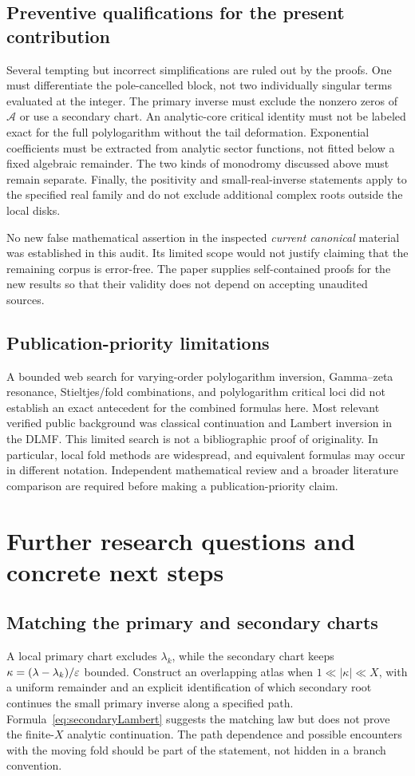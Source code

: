 \documentclass[11pt,a4paper]{article}
\numberwithin{equation}{section}
\theoremstyle{definition}\newtheorem{definition}[theorem]{Definition}
\theoremstyle{remark}\newtheorem{remark}[theorem]{Remark}
\newcommand{\A}{\mathcal A}\newcommand{\E}{\mathcal E}
\begin{document}
\subsection{Preventive qualifications for the present contribution}
Several tempting but incorrect simplifications are ruled out by the
proofs. One must differentiate the pole-cancelled block, not two
individually singular terms evaluated at the integer. The primary inverse
must exclude the nonzero zeros of $\A$ or use a secondary chart.
An analytic-core critical identity must not be labeled exact for the full
polylogarithm without the tail deformation. Exponential coefficients must
be extracted from analytic sector functions, not fitted below a fixed
algebraic remainder. The two kinds of monodromy discussed above must
remain separate. Finally, the positivity and small-real-inverse statements
apply to the specified real family and do not exclude additional complex
roots outside the local disks.

No new false mathematical assertion in the inspected \emph{current
canonical} material was established in this audit. Its limited scope
would not justify claiming that the remaining corpus is error-free.
The paper supplies self-contained proofs for the new results so that
their validity does not depend on accepting unaudited sources.

\subsection{Publication-priority limitations}
A bounded web search for varying-order polylogarithm inversion,
Gamma--zeta resonance, Stieltjes/fold combinations, and polylogarithm
critical loci did not establish an exact antecedent for the combined
formulas here. Most relevant verified public background was classical
continuation and Lambert inversion in the DLMF. This limited search is
not a bibliographic proof of originality. In particular, local fold
methods are widespread, and equivalent formulas may occur in different
notation. Independent mathematical review and a broader literature
comparison are required before making a publication-priority claim.

\section{Further research questions and concrete next steps}
\label{sec:future}
\subsection{Matching the primary and secondary charts}
A local primary chart excludes $\lambda_k$, while the secondary chart
keeps $\kappa=(\lambda-\lambda_k)/\varepsilon$ bounded. Construct an overlapping
atlas when $1\ll|\kappa|\ll X$, with a uniform remainder and an explicit
identification of which secondary root continues the small primary
inverse along a specified path. Formula~\eqref{eq:secondaryLambert}
suggests the matching law but does not prove the finite-$X$ analytic
continuation. The path dependence and possible encounters with the moving
fold should be part of the statement, not hidden in a branch convention.
\end{document}
